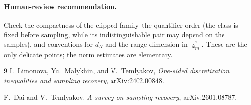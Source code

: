 \documentclass[11pt]{article}
\newcommand{\rhoo}{\varrho^{*}}
\begin{document}
\paragraph{Human-review recommendation.}
Check the compactness of the clipped family, the quantifier order (the class is
fixed before sampling, while its indistinguishable pair may depend on the
samples), and conventions for $d_N$ and the range dimension in $\rhoo_m$.
These are the only delicate points; the norm estimates are elementary.

\begin{thebibliography}{9}
I.~Limonova, Yu.~Malykhin, and V.~Temlyakov,
\emph{One-sided discretization inequalities and sampling recovery},
arXiv:2402.00848.

F.~Dai and V.~Temlyakov,
\emph{A survey on sampling recovery}, arXiv:2601.08787.
\end{thebibliography}
\end{document}
